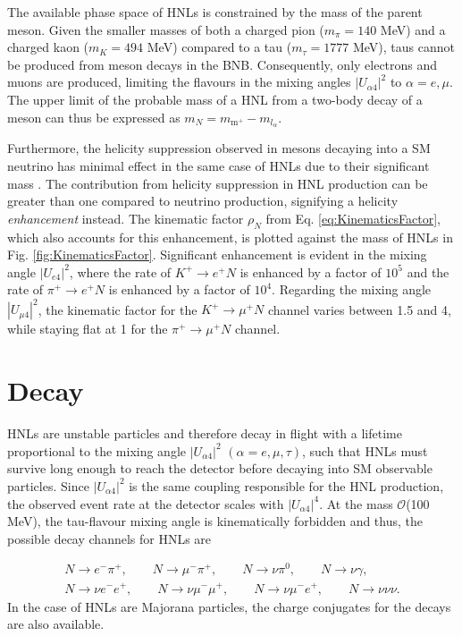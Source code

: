 The available phase space of HNLs is constrained by the mass of the parent meson.
Given the smaller masses of both a charged pion ($m_{\pi} = 140 $ MeV) and a charged kaon ($m_{K} = 494 $ MeV) compared to a tau ($m_{\tau}=1777 $ MeV), taus cannot be produced from meson decays in the BNB.
Consequently, only electrons and muons are produced, limiting the flavours in the mixing angles $|U_{\alpha4}|^{2}$ to $\alpha = e, \mu$.
The upper limit of the probable mass of a HNL from a two-body decay of a meson can thus be expressed as $m_{N} = m_{\text{m}^{+}} - m_{l_{\alpha}}$.

Furthermore, the helicity suppression observed in mesons decaying into a SM neutrino has minimal effect in the same case of HNLs due to their significant mass \cite{HNLKelly}.
The contribution from helicity suppression in HNL production can be greater than one compared to neutrino production, signifying a helicity \textit{enhancement} instead.
The kinematic factor $\rho_{N}$ from Eq. \ref{eq:KinematicsFactor}, which also accounts for this enhancement, is plotted against the mass of HNLs in Fig. \ref{fig:KinematicsFactor}.
Significant enhancement is evident in the mixing angle $|U_{e4}|^{2}$, where the rate of $K^{+}\rightarrow e^{+}N$ is enhanced by a factor of $10^{5}$ and the rate of $\pi^{+}\rightarrow e^{+}N$ is enhanced by a factor of $10^{4}$.
Regarding the mixing angle $|U_{\mu4}|^{2}$, the kinematic factor for the $K^{+}\rightarrow \mu^{+}N$ channel varies between 1.5 and 4, while staying flat at 1 for the $\pi^{+}\rightarrow \mu^{+}N$ channel.

\section{Decay}
\label{sec2Decay}

HNLs are unstable particles and therefore decay in flight with a lifetime proportional to the mixing angle $|U_{\alpha4}|^{2}$ $(\alpha=e,\mu,\tau)$, such that HNLs must survive long enough to reach the detector before decaying into SM observable particles.
Since $|U_{\alpha4}|^{2}$ is the same coupling responsible for the HNL production, the observed event rate at the detector scales with $|U_{\alpha4}|^{4}$.
At the mass $\mathcal{O}$(100 MeV), the tau-flavour mixing angle is kinematically forbidden and thus, the possible decay channels for HNLs are \cite{SBNHNL}

\begin{equation}
\begin{split}
	N\rightarrow e^{-}\pi^{+},\qquad 
	N\rightarrow \mu^{-}\pi^{+},\qquad
	N\rightarrow \nu \pi^{0},\qquad 
	N\rightarrow \nu \gamma,\qquad \\ 
	N\rightarrow \nu e^{-} e^{+},\qquad 
	N\rightarrow \nu \mu^{-} \mu^{+},\qquad 
	N\rightarrow \nu \mu^{-}e^{+},\qquad
	N\rightarrow \nu \nu \nu. 
\end{split}
\end{equation}
In the case of HNLs are Majorana particles, the charge conjugates for the decays are also available.

